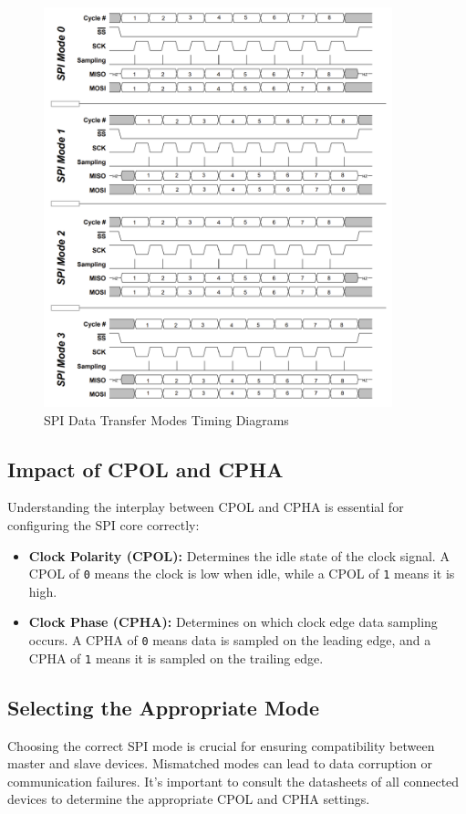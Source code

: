 \documentclass{article}
\begin{document}
\begin{figure}[H]
    \centering
    \includegraphics[width=0.9\textwidth]{images/spi_data_modes.png}
    \caption{SPI Data Transfer Modes Timing Diagrams}
    \label{fig:spi_data_modes}
\end{figure}

\subsection{Impact of CPOL and CPHA}
Understanding the interplay between CPOL and CPHA is essential for configuring the SPI core correctly:

\begin{itemize}
    \item \textbf{Clock Polarity (CPOL):} Determines the idle state of the clock signal. A CPOL of \texttt{0} means the clock is low when idle, while a CPOL of \texttt{1} means it is high.
    \item \textbf{Clock Phase (CPHA):} Determines on which clock edge data sampling occurs. A CPHA of \texttt{0} means data is sampled on the leading edge, and a CPHA of \texttt{1} means it is sampled on the trailing edge.
\end{itemize}

\subsection{Selecting the Appropriate Mode}
Choosing the correct SPI mode is crucial for ensuring compatibility between master and slave devices. Mismatched modes can lead to data corruption or communication failures. It's important to consult the datasheets of all connected devices to determine the appropriate CPOL and CPHA settings.
\end{document}
